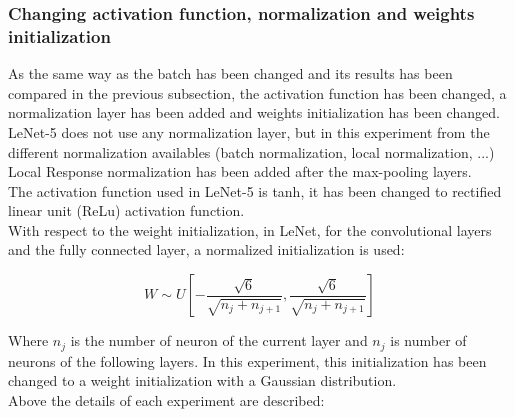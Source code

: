 

\subsubsection{Changing activation function, normalization and weights initialization}
As the same way as the batch has been changed and its results has been compared in the previous subsection, the activation function has been changed, a normalization layer has been added and weights initialization has been changed.\\

LeNet-5 does not use any normalization layer, but in this experiment from the different normalization availables (batch normalization, local normalization, ...) Local Response normalization has been added after the max-pooling layers.\\

The activation function used in LeNet-5 is tanh, it has been changed to rectified linear unit (ReLu) activation function.\\

With respect to the weight initialization, in LeNet, for the convolutional layers and the fully connected layer,  a normalized initialization \cite{XavierInitialization} is used:

\begin{equation}
  W \sim U [- \frac{\sqrt{6}}{\sqrt{n_{j}+n_{j+1}}},\frac{\sqrt{6}}{\sqrt{n_{j}+n_{j+1}}}]
\end{equation}

Where $n_{j}$ is the number of neuron of the current layer and $n_{j}$ is number of neurons of the following layers. In this experiment, this initialization has been changed to a weight initialization with a Gaussian distribution.\\

Above the details of each experiment are described:\\

